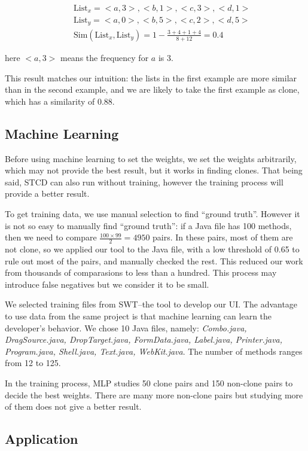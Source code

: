 \documentclass[../main.tex]{subfiles}
\begin{document}
\begin{eqnarray}\nonumber
&&\text{List}_x = {<a, 3>, <b, 1>, <c, 3>, <d, 1>}\\ \nonumber
&&\text{List}_y = {<a, 0>, <b, 5>, <c, 2>, <d, 5>} \\ 
&&\text{Sim}(\text{List}_x, \text{List}_y) = 1 - \frac{3 + 4 + 1 + 4}{8 + 12} = 0.4
\end{eqnarray}

here $<a, 3>$ means the frequency for $a$ is 3.

This result matches our intuition: the lists in the first example are more similar than in the second example, and we are likely to take the first example as clone, which has a similarity of 0.88.

\subsection{Machine Learning}

Before using machine learning to set the weights, we set the weights arbitrarily, which may not provide the best result, but it works in finding clones. That being said, STCD can also run without training, however the training process will provide a better result. 

To get training data, we use manual selection to find ``ground truth''. However it is not so easy to manually find ``ground truth'': if a Java file has 100 methods, then we need to compare $\frac{100\times 99}{2} = 4950$ pairs. In these pairs, most of them are not clone, so we applied our tool to the Java file, with a low threshold of 0.65 to rule out most of the pairs, and manually checked the rest. This reduced our work from thousands of comparasions to less than a hundred. This process may introduce false negatives but we consider it to be small.

We selected training files from SWT--the tool to develop our UI. The advantage to use data from the same project is that machine learning can learn the developer's behavior. We chose 10 Java files, namely: \textit{Combo.java, DragSource.java, DropTarget.java, FormData.java, Label.java, Printer.java, Program.java, Shell.java, Text.java, WebKit.java}. The number of methods ranges from 12 to 125.

In the training process, MLP studies 50 clone pairs and 150 non-clone pairs to decide the best weights. There are many more non-clone pairs but studying more of them does not give a better result.

\subsection{Application}
\end{document}
